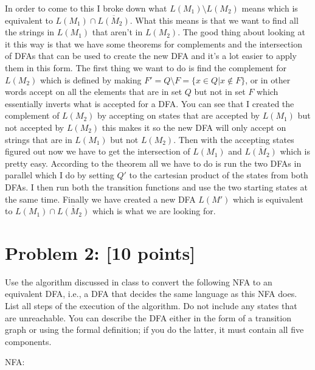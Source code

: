 \documentclass[11pt, letterpaper]{article}
\begin{document}
\noindent In order to come to this I broke down what $L(M_1) \setminus L(M_2)$ means which is equivalent to $L(M_1) \cap \overline{L(M_2)}$. What this means is that we want to find all the strings in $L(M_1)$  that aren't in $L(M_2)$. The good thing about looking at it this way is that we have some theorems for complements and the intersection of DFAs that can be used to create the new DFA and it's a lot easier to apply them in this form. The first thing we want to do is find the complement for $L(M_2)$ which is defined by making $F' = Q \setminus F = \{x \in Q| x \notin F\}$, or in other words accept on all the elements that are in set $Q$ but not in set $F$ which essentially inverts what is accepted for a DFA. You can see that I created the complement of $L(M_2)$ by accepting on states that are accepted by $L(M_1)$ but not accepted by $L(M_2)$ this makes it so the new DFA will only accept on strings that are in $L(M_1)$ but not $L(M_2)$.  Then with the accepting states figured out now we have to get the intersection of $L(M_1)$ and $\overline{L(M_2)}$ which is pretty easy. According to the theorem all we have to do is run the two DFAs in parallel which I do by setting $Q'$ to the cartesian product of the states from both DFAs. I then run both the transition functions and use the two starting states at the same time. Finally we have created a new DFA $L(M')$ which is equivalent to $L(M_1) \cap \overline{L(M_2)}$ which is what we are looking for.

\newpage

\section*{Problem 2: [10 points]}

Use the algorithm discussed in class to convert the following NFA to an equivalent DFA, i.e., a DFA that decides the same language as this NFA does. List all steps of the execution of the algorithm. Do not include any states that are unreachable. You can describe the DFA either in the form of a transition graph or using the formal definition; if you do the latter, it must contain all five components.

\vspace{5mm}

\noindent NFA:
\end{document}
